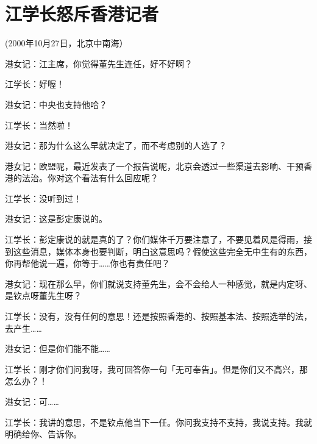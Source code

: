 % 
%
%
% 
%
\chapter{江学长怒斥香港记者}

(2000年10月27日，北京中南海）

港女记：江主席，你觉得董先生连任，好不好啊？

江学长：好喔！

港女记：中央也支持他哈？

江学长：当然啦！

港女记：那为什么这么早就决定了，而不考虑别的人选了？

港女记：欧盟呢，最近发表了一个报告说呢，北京会透过一些渠道去影响、干预香港的法治。你对这个看法有什么回应呢？

江学长：没听到过！

港女记：这是彭定康说的。

江学长：彭定康说的就是真的了？你们媒体千万要注意了，不要见着风是得雨，接到这些消息，媒体本身也要判断，明白这意思吗？假使这些完全无中生有的东西，你再帮他说一遍，你等于……你也有责任吧？

港女记：现在那么早，你们就说支持董先生，会不会给人一种感觉，就是内定呀、是钦点呀董先生呀？

江学长：没有，没有任何的意思！还是按照香港的、按照基本法、按照选举的法，去产生……

港女记：但是你们能不能……

江学长：刚才你们问我呀，我可回答你一句「无可奉告」。但是你们又不高兴，那怎么办？！

港女记：可……

江学长：我讲的意思，不是钦点他当下一任。你问我支持不支持，我说支持。我就明确给你、告诉你。


